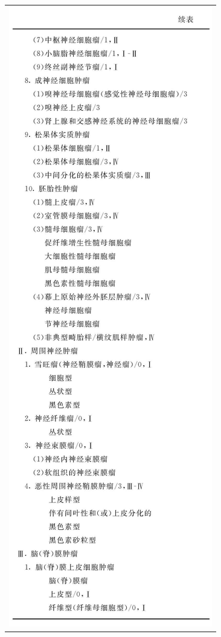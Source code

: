 \begin{longtable}{c}
\includegraphics[width=\textwidth,height=\textheight,keepaspectratio]{./images/Image00061.jpg}\\

\end{longtable}
